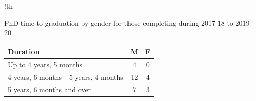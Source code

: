 \begin{tabbox}[9cm]{!th}

\caption{PhD time to graduation by gender for those completing during 2017-18 to 
2019-20}
\label{tab:phdcompletiontimes}
\footnotesize   
\begin{tabular}{p{7cm} 
                S[table-format=2.0]
                !{\qquad}
                S[table-format=2.0]}
                

\toprule 
Duration & {M} & {F} \\
\midrule 
Up to 4 years, 5 months
& 4 & 0\\
\hdashline 
4 years, 6 months - 5 years, 4 months
& 12 & 4\\
\hdashline 
5 years, 6 months and over
& 7 & 3\\

\bottomrule 
\end{tabular}


\end{tabbox}
